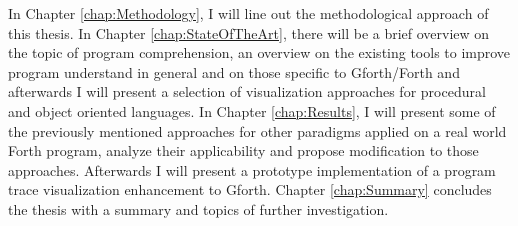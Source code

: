 In Chapter \ref{chap:Methodology}, I will line out the methodological approach of this thesis. In Chapter \ref{chap:StateOfTheArt}, there will be a brief overview on the topic of program comprehension, an overview on the existing tools to improve program understand in general and on those specific to Gforth/Forth and afterwards I will present a selection of visualization approaches for procedural and object oriented languages. In Chapter \ref{chap:Results}, I will present some of the previously mentioned approaches for other paradigms applied on a real world Forth program, analyze their applicability and propose modification to those approaches. Afterwards I will present a prototype implementation of a program trace visualization enhancement to Gforth. Chapter \ref{chap:Summary} concludes the thesis with a summary and topics of further investigation.

\begin{comment}
At first, the available information of a forth program is identified. The next step is to characterize the information and its necessity for program comprehension is investigated. The differences of forth and object oriented languages are summarized and then the applicability of existing analysis and visualization methods is presented. \hl{Since there is no standard implementation of object orientation if forth, this thesis won't take any object orientation implementation into account.}
The last part of this thesis investigates probable enhancements and modifications to existing methods and proposes new approaches.
After the conclusion, the thesis presents further suggestions to support program comprehension and further topics of research in this direction.
\end{comment}